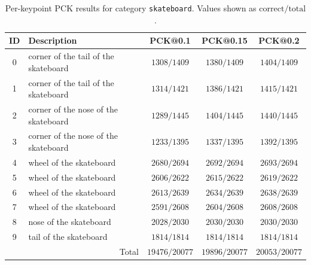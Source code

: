 \begin{table}[h]
\centering
\small
\caption{Per-keypoint PCK results for category \texttt{skateboard}. Values shown as $\text{correct}/\text{total}$.}
\label{tab:pck_skateboard}
\begin{tabular}{cl ccc}
\toprule
ID & Description & PCK@0.1 & PCK@0.15 & PCK@0.2 \\
\midrule
0 & corner of the tail of the skateboard & $1308/1409$ & $1380/1409$ & $1404/1409$ \\
1 & corner of the tail of the skateboard & $1314/1421$ & $1386/1421$ & $1415/1421$ \\
2 & corner of the nose of the skateboard & $1289/1445$ & $1404/1445$ & $1440/1445$ \\
3 & corner of the nose of the skateboard & $1233/1395$ & $1337/1395$ & $1392/1395$ \\
4 & wheel of the skateboard & $2680/2694$ & $2692/2694$ & $2693/2694$ \\
5 & wheel of the skateboard & $2606/2622$ & $2615/2622$ & $2619/2622$ \\
6 & wheel of the skateboard & $2613/2639$ & $2634/2639$ & $2638/2639$ \\
7 & wheel of the skateboard & $2591/2608$ & $2604/2608$ & $2608/2608$ \\
8 & nose of the skateboard & $2028/2030$ & $2030/2030$ & $2030/2030$ \\
9 & tail of the skateboard & $1814/1814$ & $1814/1814$ & $1814/1814$ \\
\midrule
\multicolumn{2}{r}{Total} & $19476/20077$ & $19896/20077$ & $20053/20077$ \\
\bottomrule
\end{tabular}
\end{table}

